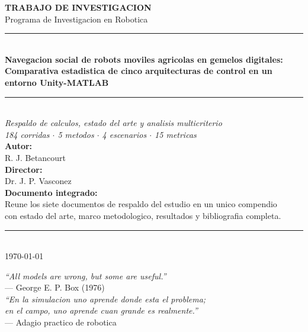 \documentclass[12pt,a4paper,oneside]{book}
\begin{document}
\begin{titlepage}
\begin{center}
\vspace*{1cm}
{\large \textbf{TRABAJO DE INVESTIGACION}}\\
\vspace{0.3cm}
{\small Programa de Investigacion en Robotica}\\
\vfill
\rule{\textwidth}{2pt}\\[0.4cm]
{\Huge\bfseries\color{primary}
Navegacion social de robots moviles agricolas en gemelos digitales:
}\\[0.4cm]
{\LARGE\bfseries\color{primary}
Comparativa estadistica de cinco arquitecturas de control en un entorno Unity-MATLAB
}\\[0.2cm]
\rule{\textwidth}{2pt}\\[1cm]
\vspace{0.5cm}
{\Large\textit{Respaldo de calculos, estado del arte y analisis multicriterio}}\\
\vspace{0.3cm}
{\large\textit{184 corridas $\cdot$ 5 metodos $\cdot$ 4 escenarios $\cdot$ 15 metricas}}\\
\vfill
{\large\textbf{Autor:}}\\[0.2cm]
{\Large R. J. Betancourt}\\[0.5cm]
{\large\textbf{Director:}}\\[0.2cm]
{\Large Dr. J. P. Vasconez}\\
\vfill
{\large\textbf{Documento integrado:}}\\
{\small Reune los siete documentos de respaldo del estudio en un unico compendio}\\
{\small con estado del arte, marco metodologico, resultados y bibliografia completa.}\\
\vfill
\rule{0.7\textwidth}{0.5pt}\\[0.4cm]
{\large \today}
\end{center}
\end{titlepage}

\thispagestyle{empty}
\cleardoublepage

\thispagestyle{empty}
\vspace*{4cm}
\begin{flushright}
\textit{``All models are wrong, but some are useful.''}\\[0.3em]
--- George E. P. Box (1976)\\[2em]
\textit{``En la simulacion uno aprende donde esta el problema;\\
en el campo, uno aprende cuan grande es realmente.''}\\[0.3em]
--- Adagio practico de robotica
\end{flushright}
\vfill
\newpage
\end{document}
